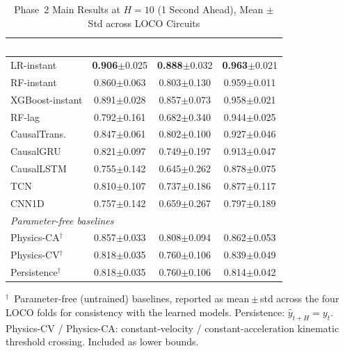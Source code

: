 \documentclass[conference,a4paper]{IEEEtran}
\begin{document}
\begin{table}[t]
\caption{Phase~2 Main Results at $H{=}10$ (1 Second Ahead), Mean $\pm$ Std across LOCO Circuits}
\label{tab:p2main}
\centering
\small
\renewcommand{\arraystretch}{1.35}
\begin{tabular}{lccc}
\toprule
\rowcolor{hdrgreen}
\textcolor{white}{\textbf{Model}} &
\textcolor{white}{\textbf{F1-Macro}} &
\textcolor{white}{\textbf{F1-Xmode}} &
\textcolor{white}{\textbf{AUC-ROC}} \\
\midrule
\rowcolor{rowhighlight}
LR-instant       & \textbf{0.906}$\pm$0.025 & \textbf{0.888}$\pm$0.032 & \textbf{0.963}$\pm$0.021 \\
RF-instant        & 0.860$\pm$0.063 & 0.803$\pm$0.130 & 0.959$\pm$0.011 \\
XGBoost-instant   & 0.891$\pm$0.028 & 0.857$\pm$0.073 & 0.958$\pm$0.021 \\
RF-lag            & 0.792$\pm$0.161 & 0.682$\pm$0.340 & 0.944$\pm$0.025 \\
CausalTrans.      & 0.847$\pm$0.061 & 0.802$\pm$0.100 & 0.927$\pm$0.046 \\
CausalGRU         & 0.821$\pm$0.097 & 0.749$\pm$0.197 & 0.913$\pm$0.047 \\
CausalLSTM        & 0.755$\pm$0.142 & 0.645$\pm$0.262 & 0.878$\pm$0.075 \\
TCN               & 0.810$\pm$0.107 & 0.737$\pm$0.186 & 0.877$\pm$0.117 \\
CNN1D             & 0.757$\pm$0.142 & 0.659$\pm$0.267 & 0.797$\pm$0.189 \\
\midrule
\multicolumn{4}{l}{\textit{Parameter-free baselines}} \\
Physics-CA$^\dagger$  & 0.857$\pm$0.033 & 0.808$\pm$0.094 & 0.862$\pm$0.053 \\
Physics-CV$^\dagger$  & 0.818$\pm$0.035 & 0.760$\pm$0.106 & 0.839$\pm$0.049 \\
Persistence$^\dagger$ & 0.818$\pm$0.035 & 0.760$\pm$0.106 & 0.814$\pm$0.042 \\
\bottomrule
\end{tabular}
\begin{flushleft}
\footnotesize
$^\dagger$~Parameter-free (untrained) baselines, reported as mean\,$\pm$\,std across the
four LOCO folds for consistency with the learned models. Persistence: $\hat{y}_{t+H} = y_t$.
Physics-CV / Physics-CA: constant-velocity / constant-acceleration kinematic threshold
crossing. Included as lower bounds.
\end{flushleft}
\end{table}
\end{document}
